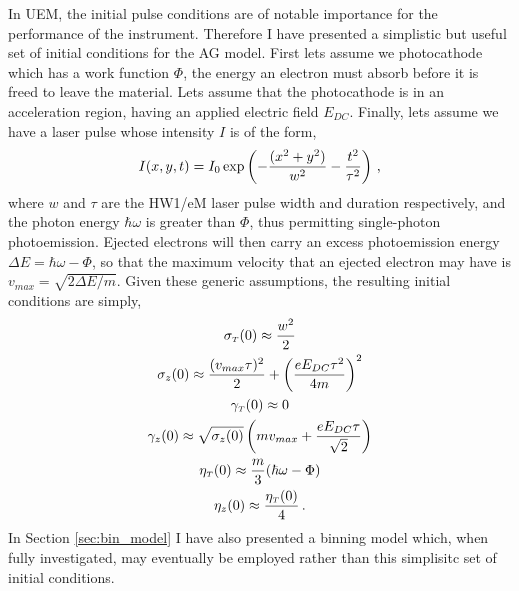 In UEM, the initial pulse conditions are of notable importance for the performance of the instrument.
Therefore I have presented a simplistic but useful set of initial conditions for the AG model.
First lets assume we photocathode which has a work function $\Phi$, the energy an electron must absorb before it is freed to leave the material.
Lets assume that the photocathode is in an acceleration region, having an applied electric field $E_{DC}$.
Finally, lets assume we have a laser pulse whose intensity $I$ is of the form,
\begin{equation}\label{eq:laser_form}
  I ( x , y , t ) = I_{0} \exp \left ( - \frac{ ( x^{2} +y^{2} ) }{ w^{2} } - \frac{ t^{ 2 } }{ \tau^{ 2 } } \right ) \, \text{,}
\end{equation}
where $w$ and $\tau$ are the HW1/eM laser pulse width and duration respectively, and the photon energy $\hbar \omega$ is greater than $\Phi$, thus permitting single-photon photoemission.
Ejected electrons will then carry an excess photoemission energy $\Delta E = \hbar \omega - \Phi$, so that the maximum velocity that an ejected electron may have is $ v_{max} = \sqrt{ 2 \Delta E / m } $.
Given these generic assumptions, the resulting initial conditions are simply,
\begin{subequations}
  \begin{gather}
    \sigma_{ {\scriptscriptstyle T} } ( 0 ) \approx \frac{ w^{ 2 } }{ 2 } \\
    \sigma_{ z } ( 0 ) \approx \frac{ ( v_{max} \tau )^{ 2 } }{ 2 } + \left ( \frac{ e E_{ DC } \tau^{ 2 } }{ 4 m } \right )^{ 2 } \\
    \gamma_{ {\scriptscriptstyle T} } ( 0 ) \approx 0 \\
    \gamma_{ z } ( 0 ) \approx \sqrt{ \sigma_{ z } ( 0 ) } \left ( m v_{max} + \frac{ e E_{DC} \tau }{ \sqrt{ 2 } } \right ) \\
    \eta_{ {\scriptscriptstyle T} } ( 0 ) \approx \frac{ m }{ 3 } ( \hbar \omega - \Phi ) \\
    \eta_{ z } ( 0 ) \approx \frac{ \eta_{ {\scriptscriptstyle T} } ( 0 ) }{ 4 } \, \text{.}
  \end{gather}
\end{subequations}
In Section \ref{sec:bin_model} I have also presented a binning model which, when fully investigated, may eventually be employed rather than this simplisitc set of initial conditions.

